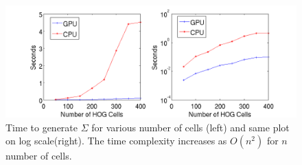 \documentclass[10pt,twocolumn,letterpaper]{article}
\begin{document}






\begin{figure}[t]
  \begin{center}
     \includegraphics[width=0.9\linewidth]{covariancetime} 
  \end{center}
  \caption{Time to generate $\Sigma$ for various number of cells (left) and same plot on log scale(right). The time complexity increases as $O(n^2)$ for $n$ number of cells.}
  \label{fig:covariancetime_crop}
\end{figure}
 
\end{document}
